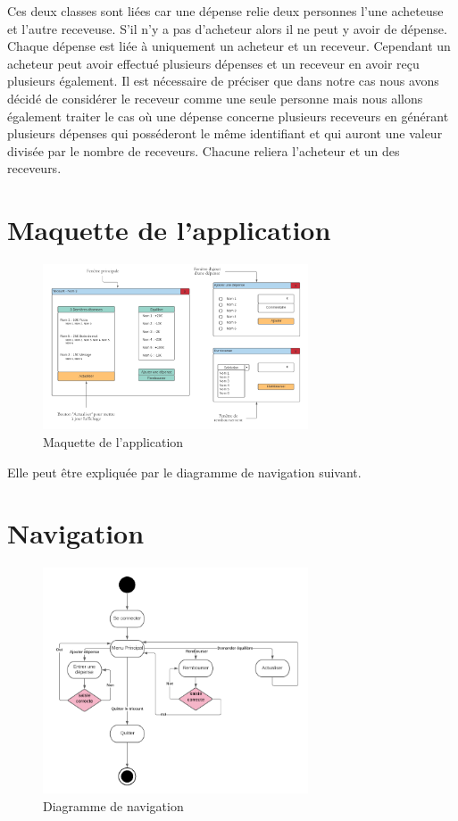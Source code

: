 \documentclass[12,french]{report}
\begin{document}
Ces deux classes sont liées car une dépense relie deux personnes l’une acheteuse et l’autre receveuse. S’il n’y a pas d’acheteur alors il ne peut y avoir de dépense. Chaque dépense est liée à uniquement un acheteur et un receveur. Cependant un acheteur peut avoir effectué plusieurs dépenses et un receveur en avoir reçu plusieurs également. 
Il est nécessaire de préciser que dans notre cas nous avons décidé de considérer le receveur comme une seule personne mais nous allons également traiter le cas où une dépense concerne plusieurs receveurs en générant plusieurs dépenses qui posséderont le même identifiant et qui auront une valeur divisée par le nombre de receveurs. Chacune reliera l’acheteur et un des receveurs. 

\section{Maquette de l'application}

\begin{figure}[H]
	\center
	\includegraphics[width=0.7\textwidth]{./Images_pooa/Maquette}
	\caption{Maquette de l'application}
\end{figure}\vspace{0.2cm}

Elle peut être expliquée par le diagramme de navigation suivant.

\section{Navigation}

\begin{figure}[H]
	\center
	\includegraphics[width=0.7\textwidth]{./Images_pooa/Navigation}
	\caption{Diagramme de navigation}
\end{figure}\vspace{0.2cm}
\end{document}
